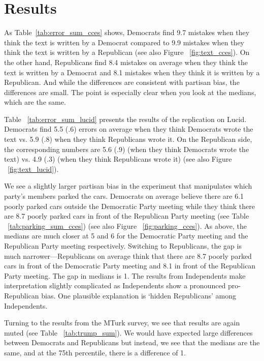 \documentclass[12pt, letterpaper]{article}
\begin{document}
\section{Results}

As Table~\ref{tab:error_sum_cces} shows, Democrats find 9.7 mistakes when they think the text is written by a Democrat compared to 9.9 mistakes when they think the text is written by a Republican (see also Figure ~\ref{fig:text_cces}). On the other hand, Republicans find 8.4 mistakes on average when they think the text is written by a Democrat and 8.1 mistakes when they think it is written by a Republican. And while the differences are consistent with partisan bias, the differences are small. The point is especially clear when you look at the medians, which are the same.



Table ~\ref{tab:error_sum_lucid} presents the results of the replication on Lucid. Democrats find 5.5 (.6) errors on average when they think Democrats wrote the text vs. 5.9 (.8) when they think Republicans wrote it. On the Republican side, the corresponding numbers are 5.6 (.9) (when they think Democrats wrote the text) vs. 4.9 (.3) (when they think Republicans wrote it) (see also Figure ~\ref{fig:text_lucid}).



We see a slightly larger partisan bias in the experiment that manipulates which party's members parked the cars. Democrats on average believe there are 6.1 poorly parked cars outside the Democratic Party meeting while they think there are 8.7 poorly parked cars in front of the Republican Party meeting (see Table ~\ref{tab:parking_sum_cces}) (see also Figure ~\ref{fig:parking_cces}). As above, the medians are much closer at 5 and 6 for the Democratic Party meeting and the Republican Party meeting respectively. Switching to Republicans, the gap is much narrower---Republicans on average think that there are 8.7 poorly parked cars in front of the Democratic Party meeting and 8.1 in front of the Republican Party meeting. The gap in medians is 1. The results from Independents make interpretation slightly complicated as Independents show a pronounced pro-Republican bias. One plausible explanation is `hidden Republicans' among Independents.



Turning to the results from the MTurk survey, we see that results are again muted (see Table ~\ref{tab:trump_sum}). We would have expected large differences between Democrats and Republicans but instead, we see that the medians are the same, and at the 75th percentile, there is a difference of 1.
\end{document}
